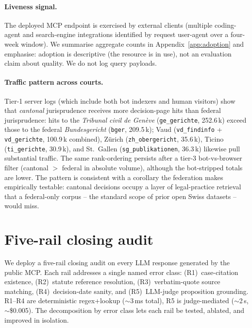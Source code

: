 \documentclass[11pt,a4paper]{article}
\begin{document}
\paragraph{Liveness signal.} The deployed MCP endpoint is exercised by external clients (multiple coding-agent and search-engine integrations identified by request user-agent over a four-week window). We summarise aggregate counts in Appendix~\ref{app:adoption} and emphasise: adoption is descriptive (the resource is in use), not an evaluation claim about quality. We do not log query payloads.

\paragraph{Traffic pattern across courts.} Tier-1 server logs (which include both bot indexers and human visitors) show that \emph{cantonal} jurisprudence receives more decision-page hits than federal jurisprudence: hits to the \emph{Tribunal civil de Gen\`eve} (\texttt{ge\_gerichte}, 252.6\,k) exceed those to the federal \emph{Bundesgericht} (\texttt{bger}, 209.5\,k); Vaud (\texttt{vd\_findinfo} + \texttt{vd\_gerichte}, 100.9\,k combined), Z\"urich (\texttt{zh\_obergericht}, 35.6\,k), Ticino (\texttt{ti\_gerichte}, 30.9\,k), and St.~Gallen (\texttt{sg\_publikationen}, 36.3\,k) likewise pull substantial traffic. The same rank-ordering persists after a tier-3 bot-vs-browser filter (cantonal $>$ federal in absolute volume), although the bot-stripped totals are lower. The pattern is consistent with a corollary the federation makes empirically testable: cantonal decisions occupy a layer of legal-practice retrieval that a federal-only corpus -- the standard scope of prior open Swiss datasets -- would miss.

\section{Five-rail closing audit}\label{sec:audit}

We deploy a five-rail closing audit on every LLM response generated by the public MCP. Each rail addresses a single named error class: (R1)~case-citation existence, (R2)~statute reference resolution, (R3)~verbatim-quote source matching, (R4)~decision-date sanity, and (R5)~LLM-judge proposition grounding. R1--R4 are deterministic regex+lookup ($\sim$3\,ms total), R5 is judge-mediated ($\sim$2\,s, $\sim$\$0.005). The decomposition by error class lets each rail be tested, ablated, and improved in isolation.
\end{document}
